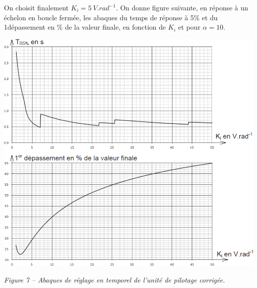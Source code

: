 \documentclass[10pt,fleqn]{article} %
\begin{document}
On choisit finalement $K_i=\SI{5}{V.rad^{-1}}$.
%
%
%
%
%
%
%
%
On donne figure suivante, en réponse à un échelon en boucle fermée, les abaques du temps de
réponse à 5\% et du 1\ier dépassement en \% de la valeur finale, en fonction de $K_i$ et pour $\alpha = 10$.


\begin{center}
\includegraphics[width=.8\linewidth]{images/fig_18}

\textit{Figure 7 --  Abaques de réglage en temporel de l'unité de pilotage corrigée.}
\end{center}
\end{document}
